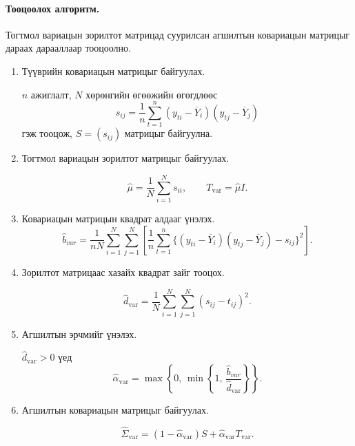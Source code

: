 \paragraph{Тооцоолох алгоритм.}

Тогтмол вариацын зорилтот матрицад суурилсан
агшилтын ковариацын матрицыг дараах
дарааллаар тооцоолно.

\begin{enumerate}
	\item Түүврийн ковариацын матрицыг байгуулах.
	
	$n$ ажиглалт, $N$ хөрөнгийн өгөөжийн
	өгөгдлөөс
	\[
	s_{ij}
	=
	\frac{1}{n}
	\sum_{t=1}^{n}
	(y_{ti}-\overline{Y}_i)
	(y_{tj}-\overline{Y}_j)
	\]
	гэж тооцож, $S=(s_{ij})$ матрицыг байгуулна.
	
	\item Тогтмол вариацын зорилтот
	матрицыг байгуулах.
	
	\[
	\widehat{\mu}
	=
	\frac{1}{N}\sum_{i=1}^{N}s_{ii},
	\qquad
	T_{\mathrm{var}}=\widehat{\mu}I.
	\]
	
	\item Ковариацын матрицын
	квадрат алдааг үнэлэх.
	\[
	\widehat{b}_{var}
	=
	\frac{1}{nN}
	\sum_{i=1}^{N}\sum_{j=1}^{N}
	\left[
	\frac{1}{n}
	\sum_{t=1}^{n}
	\{(y_{ti}-\overline{Y}_i)
	(y_{tj}-\overline{Y}_j)-s_{ij}\}^2
	\right].
	\]
	
	\item Зорилтот матрицаас хазайх
	квадрат зайг тооцох.
	
	\[
	\widehat{d}_{\mathrm{var}}
	=
	\frac{1}{N}
	\sum_{i=1}^{N}\sum_{j=1}^{N}
	(s_{ij}-t_{ij})^2.
	\]
	
	\item Агшилтын эрчмийг үнэлэх.
	
	$\widehat{d}_{\mathrm{var}}>0$
	үед
	\[
	\widehat{\alpha}_{\mathrm{var}}
	=
	\max\left\{
	0,\,
	\min\left\{
	1,\,
	\frac{\widehat{b}_{var}}
	{\widehat{d}_{\mathrm{var}}}
	\right\}
	\right\}.
	\]
	
	\item Агшилтын ковариацын
	матрицыг байгуулах.
	
	\[
	\boxed{
		\widehat{\Sigma}_{\mathrm{var}}
		=
		(1-\widehat{\alpha}_{\mathrm{var}})S
		+
		\widehat{\alpha}_{\mathrm{var}}
		T_{\mathrm{var}}
	}.
	\]
\end{enumerate}

